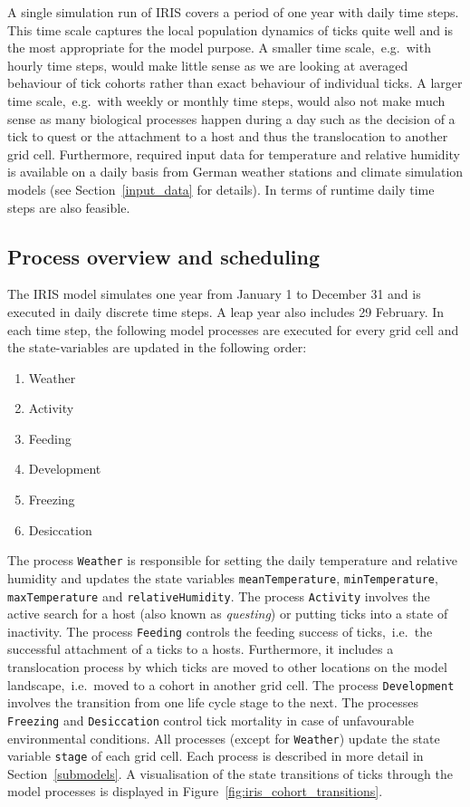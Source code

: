 \documentclass[a4paper, 11pt]{scrartcl}
\newcommand{\inlinecode}[1]{\texttt{\small #1}}
\begin{document}
A single simulation run of IRIS covers a period of one year with daily time steps. This time scale captures the local population dynamics of ticks quite well and is the most appropriate for the model purpose. A smaller time scale,~e.g.\ with hourly time steps, would make little sense as we are looking at averaged behaviour of tick cohorts rather than exact behaviour of individual ticks. A larger time scale,~e.g.\ with weekly or monthly time steps, would also not make much sense as many biological processes happen during a day such as the decision of a tick to quest or the attachment to a host and thus the translocation to another grid cell. Furthermore, required input data for temperature and relative humidity is available on a daily basis from German weather stations and climate simulation models (see Section~\ref{input_data} for details). In terms of runtime daily time steps are also feasible.


\subsection{Process overview and scheduling}
The IRIS model simulates one year from January 1 to December 31 and is executed in daily discrete time steps. A leap year also includes 29 February. In each time step, the following model processes are executed for every grid cell and the state-variables are updated in the following order:

\begin{enumerate}[noitemsep]
	\item Weather
	\item Activity
	\item Feeding
	\item Development
	\item Freezing
	\item Desiccation
\end{enumerate}

The process \inlinecode{Weather} is responsible for setting the daily temperature and relative humidity and updates the state variables \inlinecode{meanTemperature}, \inlinecode{minTemperature}, \inlinecode{maxTemperature} and \inlinecode{relativeHumidity}. The process \inlinecode{Activity} involves the active search for a host (also known as \textit{questing}) or putting ticks into a state of inactivity. The process \inlinecode{Feeding} controls the feeding success of ticks,~i.e.\ the successful attachment of a ticks to a hosts. Furthermore, it includes a translocation process by which ticks are moved to other locations on the model landscape,~i.e.\ moved to a cohort in another grid cell. The process \inlinecode{Development} involves the transition from one life cycle stage to the next. The processes \inlinecode{Freezing} and \inlinecode{Desiccation} control tick mortality in case of unfavourable environmental conditions. All processes (except for \inlinecode{Weather}) update the state variable \inlinecode{stage} of each grid cell. Each process is described in more detail in Section~\ref{submodels}. A visualisation of the state transitions of ticks through the model processes is displayed in Figure~\ref{fig:iris_cohort_transitions}.
\end{document}
